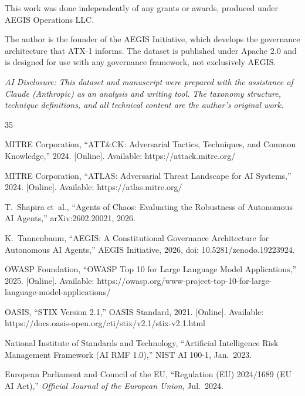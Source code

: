\documentclass{IEEEoj-data}
\begin{document}
This work was done independently of any grants or awards, produced under AEGIS Operations LLC.

The author is the founder of the AEGIS Initiative, which develops the governance architecture that ATX-1 informs. The dataset is published under Apache 2.0 and is designed for use with any governance framework, not exclusively AEGIS.

{\it AI Disclosure: This dataset and manuscript were prepared with the assistance of Claude (Anthropic) as an analysis and writing tool. The taxonomy structure, technique definitions, and all technical content are the author's original work.}


\begin{thebibliography}{35}


MITRE Corporation, ``ATT\&CK: Adversarial Tactics, Techniques, and Common Knowledge,'' 2024. [Online]. Available: https://attack.mitre.org/

MITRE Corporation, ``ATLAS: Adversarial Threat Landscape for AI Systems,'' 2024. [Online]. Available: https://atlas.mitre.org/

T.~Shapira et~al., ``Agents of Chaos: Evaluating the Robustness of Autonomous AI Agents,'' arXiv:2602.20021, 2026.

K.~Tannenbaum, ``AEGIS: A Constitutional Governance Architecture for Autonomous AI Agents,'' AEGIS Initiative, 2026, doi: 10.5281/zenodo.19223924.

OWASP Foundation, ``OWASP Top 10 for Large Language Model Applications,'' 2025. [Online]. Available: https://owasp.org/www-project-top-10-for-large-language-model-applications/

OASIS, ``STIX Version 2.1,'' OASIS Standard, 2021. [Online]. Available: https://docs.oasis-open.org/cti/stix/v2.1/stix-v2.1.html

National Institute of Standards and Technology, ``Artificial Intelligence Risk Management Framework (AI RMF 1.0),'' NIST AI 100-1, Jan.\ 2023.

European Parliament and Council of the EU, ``Regulation (EU) 2024/1689 (EU AI Act),'' {\it Official Journal of the European Union}, Jul.\ 2024.


\end{thebibliography}
\end{document}
